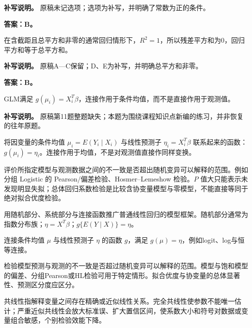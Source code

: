 \textbf{补写说明。} 原稿未记选项；选项为补写，并明确了常数为正的条件。



\textbf{答案：B。}

在含截距且总平方和非零的通常回归情形下，\(R^2=1\)，所以残差平方和为0，回归平方和等于总平方和。

\textbf{补写说明。} 原稿A---C保留；D、E为补写，并明确总平方和非零。



\textbf{答案：B。}

GLM满足 \(g(\mu_i)=X_i^T\beta\)，连接作用于条件均值，而不是直接作用于观测值。

\textbf{补写说明。} 原稿第11题整题缺失；本题为围绕课程知识点新编的练习，并非恢复的往年原题。



将因变量的条件均值 \(\mu_i=E(Y_i\mid X_i)\) 与线性预测子 \(\eta_i=X_i^T\beta\) 联系起来的函数：\(g(\mu_i)=\eta_i\)。连接作用于均值，不是对观测值直接作同样变换。



评价所指定模型与观测数据之间的不一致是否超出随机变异可以解释的范围。例如分组 Logistic 的 Pearson/偏差检验、Hosmer--Lemeshow 检验。\(P\) 值大只能表示未发现明显失拟；总体回归系数检验是比较含协变量模型与零模型，不能直接等同于绝对拟合优度检验。



用随机部分、系统部分与连接函数推广普通线性回归的模型框架。随机部分通常为指数分布族；\(\eta=X^T\beta\)；\(g\{E(Y\mid X)\}=\eta\)。



连接条件均值 \(\mu\) 与线性预测子 \(\eta\) 的函数 \(g\)，满足 \(g(\mu)=\eta\)，例如logit、log与恒等连接。



检验模型预测与观测的不一致是否超过随机变异可以解释的范围。模型与饱和模型的偏差、分组Pearson或HL检验可用于特定情形。拟合优度与协变量的总体显著性、预测区分度应区分。



共线性指解释变量之间存在精确或近似线性关系。完全共线性使参数不能唯一估计；严重近似共线性会放大标准误、扩大置信区间，使系数大小和符号对数据或变量组合敏感，个别检验效能下降。


